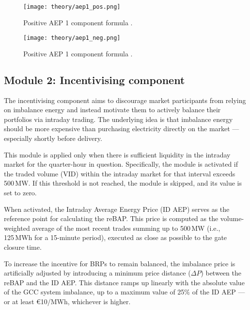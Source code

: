 \documentclass[class=scrbook, crop=false]{standalone}
\begin{document}
\begin{figure}[ht]
            \centering
            \texttt{[image: theory/aep1\_pos.png]}
            \caption[Positive AEP 1 component formula]{Positive AEP 1 component formula \cite{NetztransparenzReBAP}.}
            \label{fig::aep1_pos}
 \end{figure}
 
 

 \begin{figure}[ht]
            \centering
            \texttt{[image: theory/aep1\_neg.png]}
             \caption[Positive AEP 1 component formula]{Positive AEP 1 component formula \cite{NetztransparenzReBAP}.}
            \label{fig::aep1_neg}
 \end{figure}


\subsection{Module 2: Incentivising component}
\label{Section::Module_2}
The incentivising component aims to discourage market participants from relying on imbalance energy and instead motivate them to actively balance their portfolios via intraday trading. The underlying idea is that imbalance energy should be more expensive than purchasing electricity directly on the market — especially shortly before delivery.

This module is applied only when there is sufficient liquidity in the intraday market for the quarter-hour in question. Specifically, the module is activated if the traded volume (VID) within the intraday market for that interval exceeds 500 MW. If this threshold is not reached, the module is skipped, and its value is set to zero.

When activated, the Intraday Average Energy Price (ID AEP) serves as the reference point for calculating the reBAP. This price is computed as the volume-weighted average of the most recent trades summing up to 500 MW (i.e., 125 MWh for a 15-minute period), executed as close as possible to the gate closure time.

To increase the incentive for BRPs to remain balanced, the imbalance price is artificially adjusted by introducing a minimum price distance ($\Delta P$) between the reBAP and the ID AEP. This distance ramps up linearly with the absolute value of the GCC system imbalance, up to a maximum value of 25\% of the ID AEP — or at least €10/MWh, whichever is higher.
\end{document}
